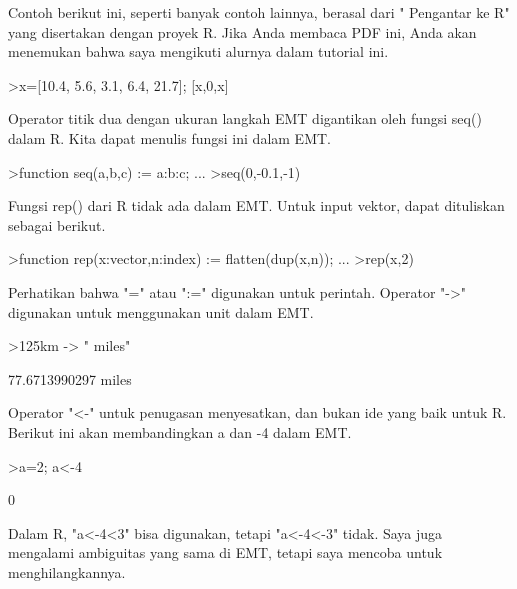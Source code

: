 \documentclass[a4paper,10pt]{article}
\begin{document}
\begin{eulernotebook}
\begin{eulercomment}
\begin{eulercomment}
\begin{eulercomment}
\begin{eulercomment}
\begin{eulercomment}
Contoh berikut ini, seperti banyak contoh lainnya, berasal dari "
Pengantar ke R" yang disertakan dengan proyek R. Jika Anda membaca PDF
ini, Anda akan menemukan bahwa saya mengikuti alurnya dalam tutorial
ini.
\end{eulercomment}
\begin{eulerprompt}
>x=[10.4, 5.6, 3.1, 6.4, 21.7]; [x,0,x]
\end{eulerprompt}
\begin{euleroutput}
  [10.4,  5.6,  3.1,  6.4,  21.7,  0,  10.4,  5.6,  3.1,  6.4,  21.7]
\end{euleroutput}
\begin{eulercomment}
Operator titik dua dengan ukuran langkah EMT digantikan oleh fungsi
seq() dalam R. Kita dapat menulis fungsi ini dalam EMT.
\end{eulercomment}
\begin{eulerprompt}
>function seq(a,b,c) := a:b:c; ...
>seq(0,-0.1,-1)
\end{eulerprompt}
\begin{euleroutput}
  [0,  -0.1,  -0.2,  -0.3,  -0.4,  -0.5,  -0.6,  -0.7,  -0.8,  -0.9,  -1]
\end{euleroutput}
\begin{eulercomment}
Fungsi rep() dari R tidak ada dalam EMT. Untuk input vektor, dapat
dituliskan sebagai berikut.
\end{eulercomment}
\begin{eulerprompt}
>function rep(x:vector,n:index) := flatten(dup(x,n)); ...
>rep(x,2)
\end{eulerprompt}
\begin{euleroutput}
  [10.4,  5.6,  3.1,  6.4,  21.7,  10.4,  5.6,  3.1,  6.4,  21.7]
\end{euleroutput}
\begin{eulercomment}
Perhatikan bahwa "=" atau ":=" digunakan untuk perintah. Operator "-\textgreater{}"
digunakan untuk menggunakan unit dalam EMT.
\end{eulercomment}
\begin{eulerprompt}
>125km -> " miles"
\end{eulerprompt}
\begin{euleroutput}
  77.6713990297 miles
\end{euleroutput}
\begin{eulercomment}
Operator "\textless{}-" untuk penugasan menyesatkan, dan bukan ide yang baik
untuk R. Berikut ini akan membandingkan a dan -4 dalam EMT. 
\end{eulercomment}
\begin{eulerprompt}
>a=2; a<-4
\end{eulerprompt}
\begin{euleroutput}
  0
\end{euleroutput}
\begin{eulercomment}
Dalam R, "a\textless{}-4\textless{}3" bisa digunakan, tetapi "a\textless{}-4\textless{}-3" tidak. Saya juga
mengalami ambiguitas yang sama di EMT, tetapi saya mencoba untuk
menghilangkannya.


\end{eulercomment}
\end{eulercomment}
\end{eulercomment}
\end{eulercomment}
\end{eulercomment}
\end{eulernotebook}
\end{document}
